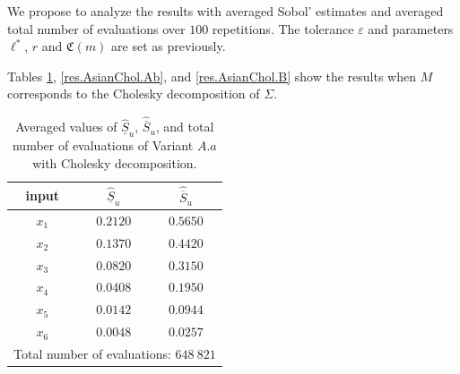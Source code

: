 We propose to analyze the results with averaged Sobol' estimates and averaged total number of evaluations over $100$ repetitions. The tolerance $\varepsilon$ and parameters $\ell^*$, $r$ and $\mathfrak{C}(m)$ are set as previously.

Tables \ref{res.AsianChol.Aa}, \ref{res.AsianChol.Ab}, and \ref{res.AsianChol.B} show the results when $M$ corresponds to the Cholesky decomposition of $\mathsf{\Sigma}$. 
\begin{table}[!ht]
\caption{Averaged values of $\widehat{\underline{S}}_u$, ${\widehat{\overline{S}}_u}$, and total number of evaluations of Variant $A.a$ with Cholesky decomposition.}
\centering
\begin{tabular}{ccc}
\hline
 input & $\widehat{\underline{S}}_u$ & $\widehat{\overline{S}}_u$ \\ \hline
 $x_1$ & $0.2120$ & $0.5650$  \\ \hline
 $x_2$ & $0.1370$ & $0.4420$  \\ \hline
 $x_3$ & $0.0820$ & $0.3150$  \\ \hline
 $x_4$ & $0.0408$ & $0.1950$  \\ \hline
 $x_5$ & $0.0142$ & $0.0944$  \\ \hline
 $x_6$ & $0.0048$ & $0.0257$  \\ \hline \hline
\multicolumn{3}{l}{Total number of evaluations: $648 \ 821$} \\ \hline 
\end{tabular}
\label{res.AsianChol.Aa}
\end{table}
